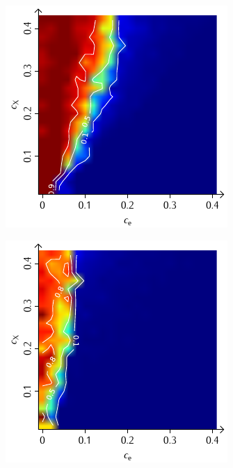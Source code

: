 \documentclass[a4paper, 10pt, twoside, openany]{book} %
\begin{document}
\begin{figure}
\begin{minipage}[t]{0.48\textwidth}
			\label{F_penalty_random_G}
		\end{minipage}
		\begin{minipage}[t]{0.48\textwidth}
			\includegraphics[width=\textwidth]{Abbildungen/Phasendiagramme/Konturen/F_individual_G.pdf}
			\label{F_individual_G}
		\end{minipage}
		\hfill
		\begin{minipage}[t]{0.48\textwidth}
			\includegraphics[width=\textwidth]{Abbildungen/Phasendiagramme/Konturen/F_penalty_individual_G.pdf}

\end{minipage}
\end{figure}
\end{document}

